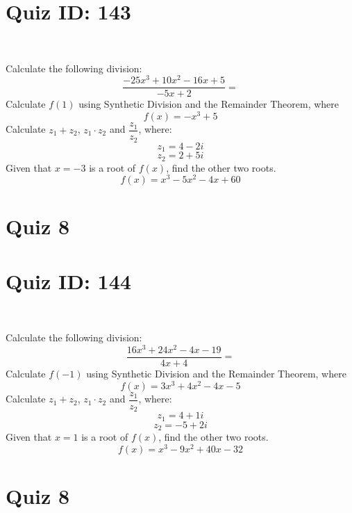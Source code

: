 \documentclass{exam}
\begin{document}
\section*{Quiz ID: 143}
\vspace{0.5cm}\
\vspace{1cm}\
\begin{questions}
\question Calculate the following division:\[\dfrac{
-25x^3 + 10x^2 - 16x + 5}{
-5x + 2}=\] \makeemptybox{\stretch{2}}
\question Calculate $f(1)$ using Synthetic Division and the Remainder Theorem, where\[f(x) = 
-x^3 + 5\]
\newpage\question Calculate $z_1+z_2$, $z_1\cdot z_2$ and $\dfrac{z_1}{z_2}$, where:\[z_1=4-2\mathit{i}\]\[z_2=2+5\mathit{i}\]\makeemptybox{\stretch{1}}
\question Given that $x=-3$ is a root of $f(x)$, find the other two roots.\[f(x)=
x^3 - 5x^2 - 4x + 60\]\makeemptybox{\stretch{1}}
\end{questions}\newpage
\newpage
\section*{Quiz 8}
\section*{Quiz ID: 144}
\vspace{0.5cm}\
\vspace{1cm}\
\begin{questions}
\question Calculate the following division:\[\dfrac{
16x^3 + 24x^2 - 4x - 19}{
4x + 4}=\] 
\question Calculate $f(-1)$ using Synthetic Division and the Remainder Theorem, where\[f(x) = 
3x^3 + 4x^2 - 4x - 5\]
\newpage\question Calculate $z_1+z_2$, $z_1\cdot z_2$ and $\dfrac{z_1}{z_2}$, where:\[z_1=4+1\mathit{i}\]\[z_2=-5+2\mathit{i}\]\makeemptybox{\stretch{1}}
\question Given that $x=1$ is a root of $f(x)$, find the other two roots.\[f(x)=
x^3 - 9x^2 + 40x - 32\]\makeemptybox{\stretch{1}}
\end{questions}\newpage
\newpage
\section*{Quiz 8}
\end{document}
